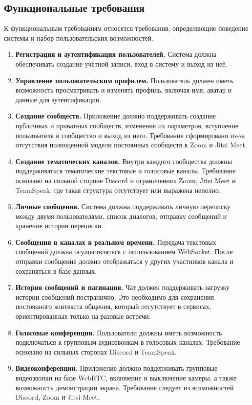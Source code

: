 \documentclass[a4paper,12pt]{extarticle}
\begin{document}
\subsection{Функциональные требования}

К функциональным требованиям относятся требования, определяющие поведение системы и набор пользовательских возможностей.

\begin{enumerate}
    \item \textbf{Регистрация и аутентификация пользователей.} Система должна обеспечивать создание учётной записи, вход в систему и выход из неё.
    \item \textbf{Управление пользовательским профилем.} Пользователь должен иметь возможность просматривать и изменять профиль, включая имя, аватар и данные для аутентификации.
    \item \textbf{Создание сообществ.} Приложение должно поддерживать создание публичных и приватных сообществ, изменение их параметров, вступление пользователя в сообщество и выход из него. Требование сформировано из-за отсутствия полноценной модели постоянных сообществ в Zoom и Jitsi Meet.
    \item \textbf{Создание тематических каналов.} Внутри каждого сообщества должны поддерживаться тематические текстовые и голосовые каналы. Требование основано на сильной стороне Discord и ограничениях Zoom, Jitsi Meet и TeamSpeak, где такая структура отсутствует или выражена неполно.
    \item \textbf{Личные сообщения.} Система должна поддерживать личную переписку между двумя пользователями, список диалогов, отправку сообщений и хранение истории переписки.
    \item \textbf{Сообщения в каналах в реальном времени.} Передача текстовых сообщений должна осуществляться с использованием WebSocket. После отправки сообщение должно отображаться у других участников канала и сохраняться в базе данных.
    \item \textbf{История сообщений и пагинация.} Чат должен поддерживать загрузку истории сообщений постранично. Это необходимо для сохранения постоянного контекста общения, который отсутствует в сервисах, ориентированных только на разовые встречи.
    \item \textbf{Голосовые конференции.} Пользователи должны иметь возможность подключаться к групповым аудиозвонкам в голосовых каналах. Требование основано на сильных сторонах Discord и TeamSpeak.
    \item \textbf{Видеоконференции.} Приложение должно поддерживать групповые видеозвонки на базе WebRTC, включение и выключение камеры, а также возможность демонстрации экрана. Требование следует из возможностей Discord, Zoom и Jitsi Meet.

\end{enumerate}
\end{document}
